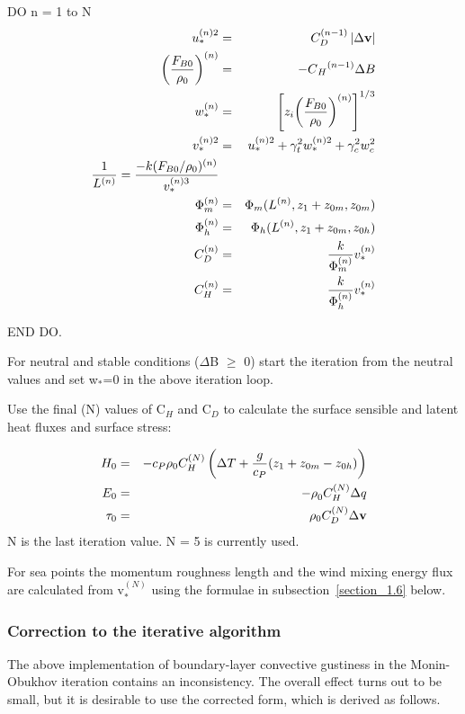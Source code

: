 \documentclass{UMDP_article}
\begin{document}
DO n = 1 to N
\begin{eqnarray}
  u_\ast ^{(n)2}&=& C_D^{(n-1)} \left| {\Delta {{\rm {\bf v}}}} \right|
  \label{1.4.10} \\
  {\left( {\frac{ F_{B0} }{ \rho _0 }} \right)}^{(n)}&=& { {-C}_H }^{(n-1)} \Delta B
  \label{1.4.11}\\
  w_\ast ^{(n)}&=& {\left[ {  z_i  {\left( {\frac{ F_{B0} }{ \rho _0 }} \right)}^{(n)} } \right]}^{ 1/3}
  \label{1.4.12}\\
  v_\ast ^{(n)2}&=& u_\ast ^{(n)2} +  \gamma _t^2  w_\ast ^{(n)2} +  \gamma _c^2  w_c^2 
  \label{1.4.13}\\
  \frac{1}{ L^{(n)} } = \frac{-k( F_{B0} / \rho _0  )^{(n)} }{ v_\ast ^{(n)3} }
  \label{1.4.14}\\
  \Phi _m^{(n)}&=& \Phi _m ( L^{(n)} ,  z_1 +  z_{0m} ,  z_{0m} )
  \label{1.4.15} \\
  \Phi _h^{(n)}&=& \Phi _h ( L^{(n)} ,  z_1 +  z_{0m} ,  z_{0h} )
  \label{1.4.16} \\
  C_D^{(n)}&=&\frac{k}{ \Phi _m^{(n)} }  v_\ast ^{(n)}
  \label{1.4.17} \\
  C_H^{(n)}&=&\frac{k}{ \Phi _h^{(n)} }  v_\ast ^{(n)}
  \label{1.4.18}
\end{eqnarray}

END DO.

For neutral and stable conditions ($\Delta $B $\ge $ 0) start the
iteration from the neutral values and set w$_{\ast }$=0 in the above
iteration loop.

Use the final (N) values of C$_{H}$ and C$_{D}$ to calculate the
surface sensible and latent heat fluxes and surface stress:

\begin{eqnarray}
  H_0&=& {-c}_P  \rho _0  C_H^{(N)} \left( {\Delta T + \frac{g}{ c_P }( z_1 +  z_{0m} -  z_{0h} )} \right)
  \label{1.4.19} \\
  E_0&=& {-\rho }_0  C_H^{(N)} \Delta q
  \label{1.4.20} \\
  {\rm {\bf \tau }}_{0} &=& \rho _0  C_D^{(N)} \Delta {\rm {\bf v}}
  \label{1.4.21}
\end{eqnarray}
N is the last iteration value. N = 5 is currently used.

For sea points the momentum roughness length and the wind mixing
energy flux are calculated from v$_{\ast }^{(N)}$ using the formulae
in subsection~\ref{section_1.6} below.

\subsubsection{Correction to the iterative algorithm}\label{mo_iter_corrn}
The above implementation of boundary-layer convective gustiness in the
Monin-Obukhov iteration contains an inconsistency. The overall effect
turns out to be small, but it is desirable to use the corrected form,
which is derived as follows.
\end{document}
